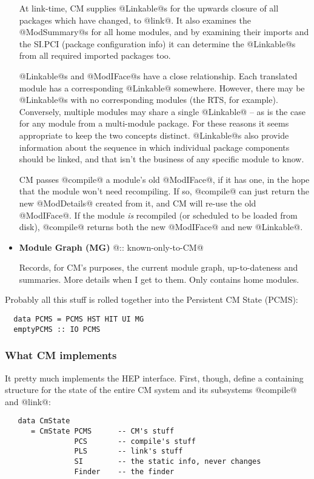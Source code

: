 \documentclass[11pt]{article}
\begin{document}
\begin{itemize}
   At link-time, CM supplies @Linkable@s for the upwards closure of
   all packages which have changed, to @link@.  It also examines the
   @ModSummary@s for all home modules, and by examining their imports
   and the SI.PCI (package configuration info) it can determine the
   @Linkable@s from all required imported packages too.

   @Linkable@s and @ModIFace@s have a close relationship.  Each
   translated module has a corresponding @Linkable@ somewhere.
   However, there may be @Linkable@s with no corresponding modules
   (the RTS, for example).  Conversely, multiple modules may share a
   single @Linkable@ -- as is the case for any module from a
   multi-module package.  For these reasons it seems appropriate to
   keep the two concepts distinct.  @Linkable@s also provide
   information about the sequence in which individual package
   components should be linked, and that isn't the business of any
   specific module to know.

   CM passes @compile@ a module's old @ModIFace@, if it has one, in
   the hope that the module won't need recompiling.  If so, @compile@
   can just return the new @ModDetails@ created from it, and CM will
   re-use the old @ModIFace@.  If the module {\em is} recompiled (or 
   scheduled to be loaded from disk), @compile@ returns both the 
   new @ModIFace@ and new @Linkable@.

\item 
   {\bf Module Graph (MG)} @:: known-only-to-CM@

   Records, for CM's purposes, the current module graph,
   up-to-dateness and summaries.  More details when I get to them.
   Only contains home modules.
\end{itemize}
Probably all this stuff is rolled together into the Persistent CM
State (PCMS):
\begin{verbatim}
  data PCMS = PCMS HST HIT UI MG
  emptyPCMS :: IO PCMS
\end{verbatim}

\subsubsection{What CM implements}
It pretty much implements the HEP interface.  First, though, define a 
containing structure for the state of the entire CM system and its
subsystems @compile@ and @link@:
\begin{verbatim}
   data CmState 
      = CmState PCMS      -- CM's stuff
                PCS       -- compile's stuff
                PLS       -- link's stuff
                SI        -- the static info, never changes
                Finder    -- the finder
\end{verbatim}
\end{document}
